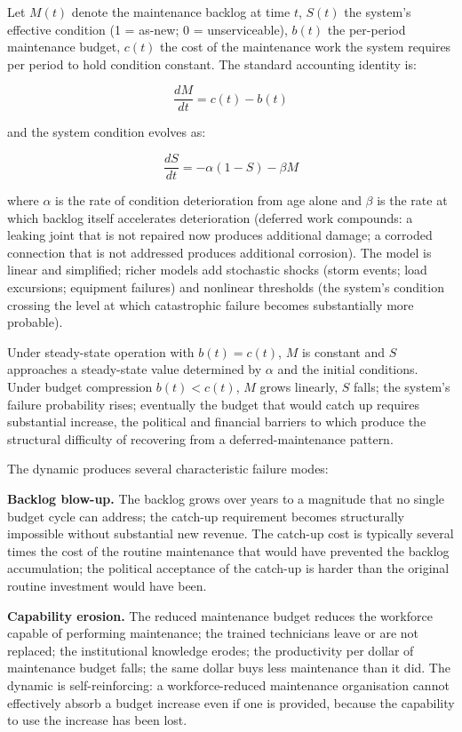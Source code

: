 Let $M(t)$ denote the maintenance backlog at time $t$, $S(t)$ the system's effective condition (1 = as-new; 0 = unserviceable), $b(t)$ the per-period maintenance budget, $c(t)$ the cost of the maintenance work the system requires per period to hold condition constant. The standard accounting identity is:

\[
\frac{dM}{dt} = c(t) - b(t)
\]

and the system condition evolves as:

\[
\frac{dS}{dt} = -\alpha (1 - S) - \beta M
\]

where $\alpha$ is the rate of condition deterioration from age alone and $\beta$ is the rate at which backlog itself accelerates deterioration (deferred work compounds: a leaking joint that is not repaired now produces additional damage; a corroded connection that is not addressed produces additional corrosion). The model is linear and simplified; richer models add stochastic shocks (storm events; load excursions; equipment failures) and nonlinear thresholds (the system's condition crossing the level at which catastrophic failure becomes substantially more probable).

Under steady-state operation with $b(t) = c(t)$, $M$ is constant and $S$ approaches a steady-state value determined by $\alpha$ and the initial conditions. Under budget compression $b(t) < c(t)$, $M$ grows linearly, $S$ falls; the system's failure probability rises; eventually the budget that would catch up requires substantial increase, the political and financial barriers to which produce the structural difficulty of recovering from a deferred-maintenance pattern.

The dynamic produces several characteristic failure modes:

\textbf{Backlog blow-up.} The backlog grows over years to a magnitude that no single budget cycle can address; the catch-up requirement becomes structurally impossible without substantial new revenue. The catch-up cost is typically several times the cost of the routine maintenance that would have prevented the backlog accumulation; the political acceptance of the catch-up is harder than the original routine investment would have been.

\textbf{Capability erosion.} The reduced maintenance budget reduces the workforce capable of performing maintenance; the trained technicians leave or are not replaced; the institutional knowledge erodes; the productivity per dollar of maintenance budget falls; the same dollar buys less maintenance than it did. The dynamic is self-reinforcing: a workforce-reduced maintenance organisation cannot effectively absorb a budget increase even if one is provided, because the capability to use the increase has been lost.

